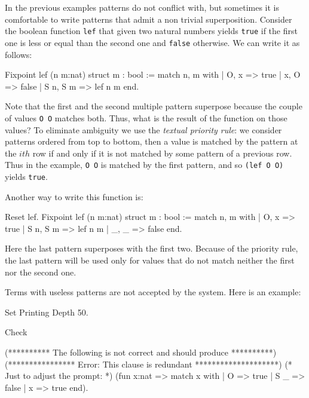 In the previous examples patterns do not conflict with, but
sometimes it is comfortable to write patterns that admit a non
trivial superposition. Consider
the boolean function \texttt{lef} that given two natural numbers
yields \texttt{true} if the first one is less or equal than the second
one and \texttt{false} otherwise. We can write it as follows:

\begin{coq_example}
Fixpoint lef (n m:nat) {struct m} : bool :=
  match n, m with
  | O, x => true
  | x, O => false
  | S n, S m => lef n m
  end.
\end{coq_example}

Note that the first and the second multiple pattern superpose because
the couple of values \texttt{O O} matches both. Thus, what is the result
of the function on those values?  To eliminate ambiguity we use the
{\em textual priority rule}: we consider patterns ordered from top to
bottom, then a value is matched by the pattern at the $ith$ row if and
only if it is not matched by some pattern of a previous row. Thus in the
example,
\texttt{O O} is matched by the first pattern, and so \texttt{(lef O O)}
yields \texttt{true}.

Another way to write  this function is:

\begin{coq_example}
Reset lef.
Fixpoint lef (n m:nat) {struct m} : bool :=
  match n, m with
  | O, x => true
  | S n, S m => lef n m
  | _, _ => false
  end.
\end{coq_example}


Here the last pattern superposes with the first two. Because
of the priority rule, the last pattern 
will be used only for values that do not match neither the  first nor
the second one.  

Terms with useless patterns are not accepted by the
system. Here is an example:
\begin{coq_eval}
Set Printing Depth 50.
\end{coq_eval}
\begin{coq_example}
Check
  
  (********** The following is not correct and should produce **********)
  (**************** Error: This clause is redundant ********************)
  (* Just to adjust the prompt: *) (fun x:nat =>
                                      match x with
                                      | O => true
                                      | S _ => false
                                      | x => true
                                      end).
\end{coq_example}

